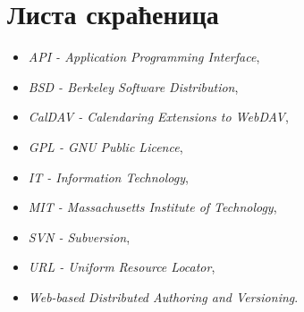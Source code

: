 \chapter*{Листа скраћеница}

\begin{itemize}
	\item{\textit{API - Application Programming Interface}},
	\item{\textit{BSD - Berkeley Software Distribution}},
	\item{\textit{CalDAV - Calendaring Extensions to WebDAV}},
	\item{\textit{GPL - GNU Public Licence}},
	\item{\textit{IT - Information Technology}},
	\item{\textit{MIT - Massachusetts Institute of Technology}},
	\item{\textit{SVN - Subversion}},
	\item{\textit{URL - Uniform Resource Locator}},
	\item{\textit{Web-based Distributed Authoring and Versioning}}.
\end{itemize}